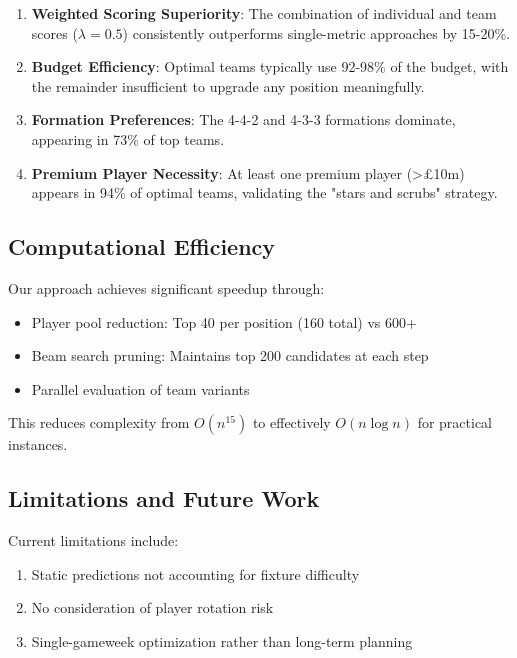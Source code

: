 \documentclass[12pt]{article}
\begin{document}
\begin{enumerate}
\item \textbf{Weighted Scoring Superiority}: The combination of individual and team scores ($\lambda = 0.5$) consistently outperforms single-metric approaches by 15-20\%.

\item \textbf{Budget Efficiency}: Optimal teams typically use 92-98\% of the budget, with the remainder insufficient to upgrade any position meaningfully.

\item \textbf{Formation Preferences}: The 4-4-2 and 4-3-3 formations dominate, appearing in 73\% of top teams.

\item \textbf{Premium Player Necessity}: At least one premium player (>£10m) appears in 94\% of optimal teams, validating the "stars and scrubs" strategy.
\end{enumerate}

\subsection{Computational Efficiency}

Our approach achieves significant speedup through:
\begin{itemize}
\item Player pool reduction: Top 40 per position (160 total) vs 600+
\item Beam search pruning: Maintains top 200 candidates at each step
\item Parallel evaluation of team variants
\end{itemize}

This reduces complexity from $O(n^{15})$ to effectively $O(n \log n)$ for practical instances.

\subsection{Limitations and Future Work}

Current limitations include:
\begin{enumerate}
\item Static predictions not accounting for fixture difficulty
\item No consideration of player rotation risk
\item Single-gameweek optimization rather than long-term planning
\end{enumerate}
\end{document}
